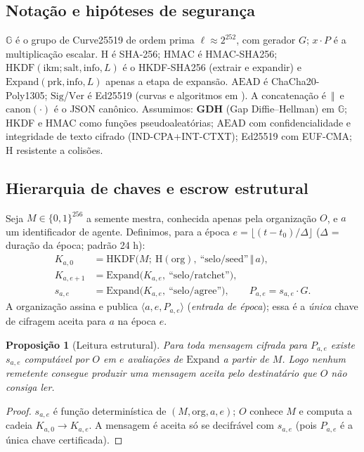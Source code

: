 \documentclass[11pt,a4paper]{article}
\theoremstyle{plain}
\newtheorem{proposicao}{Proposição}
\theoremstyle{definition}
\theoremstyle{remark}
\newcommand{\HKDF}{\mathrm{HKDF}}
\newcommand{\Exp}{\mathrm{Expand}}
\newcommand{\HMAC}{\mathrm{HMAC}}
\newcommand{\Hash}{\mathrm{H}}
\newcommand{\cat}{\,\Vert\,}
\newcommand{\Sig}{\mathrm{Sig}}
\newcommand{\Ver}{\mathrm{Ver}}
\newcommand{\AEAD}{\mathrm{AEAD}}
\begin{document}
\subsection{Notação e hipóteses de segurança}

$\mathbb{G}$ é o grupo de Curve25519 de ordem prima $\ell\approx 2^{252}$, com gerador $G$; $x\cdot P$ é a multiplicação escalar. $\Hash$ é SHA-256; $\HMAC$ é HMAC-SHA256; $\HKDF(\text{ikm};\text{salt},\text{info},L)$ é o HKDF-SHA256 \cite{hkdf} (extrair e expandir) e $\Exp(\text{prk},\text{info},L)$ apenas a etapa de expansão. $\AEAD$ é ChaCha20-Poly1305; $\Sig$/$\Ver$ é Ed25519 (curvas e algoritmos em \cite{curves}). A concatenação é $\cat$ e $\mathrm{canon}(\cdot)$ é o JSON canônico. Assumimos: \textbf{GDH} (Gap Diffie--Hellman) em $\mathbb{G}$; HKDF e HMAC como funções pseudoaleatórias; $\AEAD$ com confidencialidade e integridade de texto cifrado (IND-CPA+INT-CTXT); Ed25519 com EUF-CMA; $\Hash$ resistente a colisões.

\subsection{Hierarquia de chaves e escrow estrutural}

Seja $M\in\{0,1\}^{256}$ a semente mestra, conhecida apenas pela organização $O$, e $a$ um identificador de agente. Definimos, para a época $e=\lfloor (t-t_0)/\Delta\rfloor$ ($\Delta$ = duração da época; padrão 24 h):
\begin{align}
K_{a,0} &= \HKDF\big(M;\ \Hash(\text{org}),\ \text{``selo/seed''}\cat a\big),\\
K_{a,e+1} &= \Exp\big(K_{a,e},\ \text{``selo/ratchet''}\big),\\
s_{a,e} &= \Exp\big(K_{a,e},\ \text{``selo/agree''}\big),\qquad P_{a,e}=s_{a,e}\cdot G.
\end{align}
A organização assina e publica $\langle a,e,P_{a,e}\rangle$ (\emph{entrada de época}); essa é a \emph{única} chave de cifragem aceita para $a$ na época $e$.

\begin{proposicao}[Leitura estrutural]
Para toda mensagem cifrada para $P_{a,e}$ existe $s_{a,e}$ computável por $O$ em $e$ avaliações de $\Exp$ a partir de $M$. Logo nenhum remetente consegue produzir uma mensagem aceita pelo destinatário que $O$ não consiga ler.
\end{proposicao}
\begin{proof}
$s_{a,e}$ é função determinística de $(M,\text{org},a,e)$; $O$ conhece $M$ e computa a cadeia $K_{a,0}\to K_{a,e}$. A mensagem é aceita só se decifrável com $s_{a,e}$ (pois $P_{a,e}$ é a única chave certificada). \qedhere
\end{proof}
\end{document}

